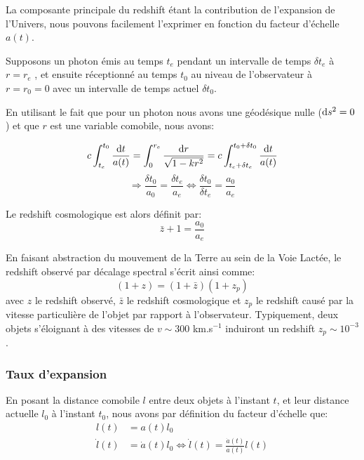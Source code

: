 \documentclass[../main/main.tex]{subfiles}
\begin{document}
La composante principale du redshift étant la contribution de
l'expansion de l'Univers, nous pouvons facilement l'exprimer en fonction
du facteur d'échelle $a(t)$.

Supposons un photon émis au temps $t_{e}$ pendant un intervalle de temps
$\delta t_{e}$ à $r = r_{e}$ , et ensuite réceptionné au temps $t_{0}$
au niveau de l’observateur à $r = r_{0} = 0$ avec un intervalle de temps
actuel $\delta t_{0}$.

En utilisant le fait que pour un photon nous avons une géodésique nulle
($\mathrm{d} s^{2}=0$) et que $r$ est une variable comobile,
nous avons:

\begin{equation}
  \label{eq:geodesiquephoton}
  c\int_{t_{e}}^{t_{0}}\frac{\mathrm{d} t}{a(t)}=\int_{0}^{r_{e}} \frac{\mathrm{d}
    r}{\sqrt{1-kr^{2}}}=c\int_{t_{e}+\delta t_{e}}^{t_{0}+\delta t_{0}}\frac{\mathrm{d} t}{a(t)}
\end{equation}
\begin{equation*}
  \Rightarrow \frac{\delta t_{0}}{a_{0}} = \frac{\delta t_{e}}{a_{e}}
  \Leftrightarrow \frac{\delta t_{0}}{\delta t_{e}} = \frac{a_{0}}{a_{e}}
\end{equation*}

Le redshift cosmologique est alors définit par:
\begin{equation}
  \label{eq:zcosmo}
  \bar{z}+1=\frac{a_{0}}{a_{e}}
\end{equation}

En faisant abstraction du mouvement de la Terre au sein de la Voie
Lactée, le redshift observé par décalage spectral s'écrit ainsi comme:
\begin{equation}
  \label{eq:22}
  (1+z)=(1+\bar{z})(1+z_{p})
\end{equation}
avec $z$ le redshift observé, $\bar{z}$ le redshift cosmologique et
$z_{p}$ le redshift causé par la vitesse particulière de l’objet par
rapport à l’observateur. Typiquement, deux objets s'éloignant à des
vitesses de $v\sim300$ km.s$^{-1}$ induiront un redshift $z_{p}\sim10^{-3}$.

\subsubsection{Taux d'expansion}

En posant la distance comobile $l$ entre deux objets à l'instant $t$, et
leur distance actuelle $l_{0}$ à l'instant $t_{0}$, nous avons par
définition du facteur d'échelle que:
\begin{align*}
  l(t)&=a(t)l_{0}\\
  \dot{l}(t)&=\dot{a}(t)l_{0} \Leftrightarrow \dot{l}(t)=\frac{\dot{a}(t)}{a(t)}l(t)
\end{align*}
\end{document}
